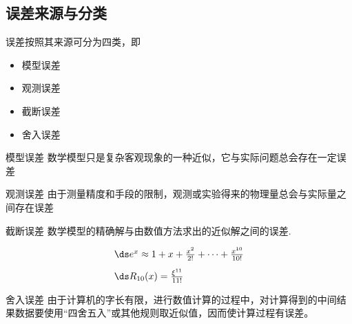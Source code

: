 \subsection{误差来源与分类}
\begin{frame}\ft{\subsecname}

误差按照其来源可分为四类，即\vspace{0.1in}
\begin{itemize}
\item
\colorbox{fcolor5}{模型误差}
\item
\colorbox{fcolor5}{观测误差}
\item
\colorbox{fcolor5}{截断误差}
\item
\colorbox{fcolor5}{舍入误差}
\end{itemize}

\end{frame}



\begin{frame}\ft{\subsecname}


\textcolor{acolor3}{模型误差}
数学模型只是复杂客观现象的一种近似，它与实际问题总会存在一定误差
\pause 
  
\textcolor{acolor3}{观测误差}
由于测量精度和手段的限制，观测或实验得来的物理量总会与实际量之间存在误差
 
\end{frame}
\begin{frame}\ft{\subsecname}

 
\textcolor{acolor3}{截断误差}
数学模型的精确解与由数值方法求出的近似解之间的误差.


$$
\begin{array}{l}
\ds e^x \approx  1+x+\frac{x^2}{2!}+\cdots+\frac{x^{10}}{10!} \\[0.3cm]
\ds R_{10}(x) = \frac{{\xi}^{11}}{11!}
\end{array}
$$
 
\end{frame}

\begin{frame}\ft{\subsecname}
 
\textcolor{acolor3}{舍入误差}
由于计算机的字长有限，进行数值计算的过程中，对计算得到的中间结果数据要使用“四舍五入”或其他规则取近似值，因而使计算过程有误差。
 
%

\end{frame}
